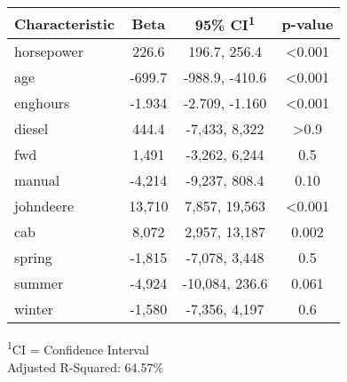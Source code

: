 \documentclass[
]{article}
\newenvironment{Shaded}{\begin{snugshade}}{\end{snugshade}}
\newcommand{\AttributeTok}[1]{\textcolor[rgb]{0.77,0.63,0.00}{#1}}
\newcommand{\CommentTok}[1]{\textcolor[rgb]{0.56,0.35,0.01}{\textit{#1}}}
\newcommand{\DecValTok}[1]{\textcolor[rgb]{0.00,0.00,0.81}{#1}}
\newcommand{\FunctionTok}[1]{\textcolor[rgb]{0.00,0.00,0.00}{#1}}
\newcommand{\NormalTok}[1]{#1}
\newcommand{\SpecialCharTok}[1]{\textcolor[rgb]{0.00,0.00,0.00}{#1}}
\newcommand{\StringTok}[1]{\textcolor[rgb]{0.31,0.60,0.02}{#1}}
\begin{document}
\begin{Shaded}
\end{Shaded}

\setlength{\LTpost}{0mm}
\begin{longtable}{lccc}
\toprule
\textbf{Characteristic} & \textbf{Beta} & \textbf{95\% CI}\textsuperscript{1} & \textbf{p-value} \\ 
\midrule
horsepower & 226.6 & 196.7, 256.4 & <0.001 \\ 
age & -699.7 & -988.9, -410.6 & <0.001 \\ 
enghours & -1.934 & -2.709, -1.160 & <0.001 \\ 
diesel & 444.4 & -7,433, 8,322 & >0.9 \\ 
fwd & 1,491 & -3,262, 6,244 & 0.5 \\ 
manual & -4,214 & -9,237, 808.4 & 0.10 \\ 
johndeere & 13,710 & 7,857, 19,563 & <0.001 \\ 
cab & 8,072 & 2,957, 13,187 & 0.002 \\ 
spring & -1,815 & -7,078, 3,448 & 0.5 \\ 
summer & -4,924 & -10,084, 236.6 & 0.061 \\ 
winter & -1,580 & -7,356, 4,197 & 0.6 \\ 
\bottomrule
\end{longtable}
\begin{minipage}{\linewidth}
\textsuperscript{1}CI = Confidence Interval\\
Adjusted R-Squared: 64.57\%\\
\end{minipage}
\end{document}
